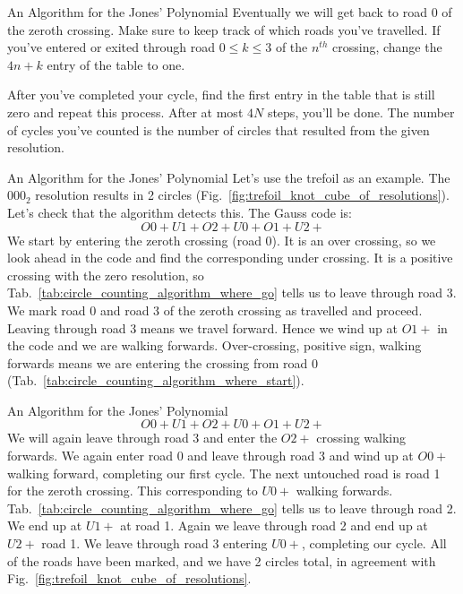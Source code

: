 \documentclass{beamer}
\begin{document}
    \begin{frame}{An Algorithm for the Jones' Polynomial}
        Eventually we will get back to road 0 of the zeroth crossing.
        Make sure to keep track of which roads you've travelled. If you've
        entered or exited through road $0\leq{k}\leq{3}$ of the $n^{th}$
        crossing, change the $4n+k$ entry of the table to one.
        \par\hfill\par
        After you've completed your cycle, find the first entry in the table
        that is still zero and repeat this process. After at most $4N$ steps,
        you'll be done. The number of cycles you've counted is the number of
        circles that resulted from the given resolution.
    \end{frame}
    \begin{frame}{An Algorithm for the Jones' Polynomial}
        Let's use the trefoil as an example. The $000_{2}$ resolution results
        in 2 circles (Fig.~\ref{fig:trefoil_knot_cube_of_resolutions}). Let's
        check that the algorithm detects this. The Gauss code is:
        \begin{equation}
            O0+U1+O2+U0+O1+U2+
        \end{equation}
        We start by entering the zeroth crossing
        (road 0). It is an over crossing, so we look ahead in the code and
        find the corresponding under crossing. It is a positive crossing with
        the zero resolution, so Tab.~\ref{tab:circle_counting_algorithm_where_go} tells
        us to leave through road 3. We mark road 0 and road 3 of the zeroth
        crossing as travelled and proceed. Leaving through road 3 means we
        travel forward. Hence we wind up at $O1+$ in the code and we are
        walking forwards. Over-crossing, positive sign, walking forwards means
        we are entering the crossing from road 0
        (Tab.~\ref{tab:circle_counting_algorithm_where_start}).
    \end{frame}
    \begin{frame}{An Algorithm for the Jones' Polynomial}
        \begin{equation}
            O0+U1+O2+U0+O1+U2+
        \end{equation}
        We will again leave through road 3 and enter the $O2+$ crossing walking
        forwards. We again enter road 0 and leave through road 3 and wind up at
        $O0+$ walking forward, completing our first cycle. The next untouched
        road is road 1 for the zeroth crossing. This corresponding to $U0+$
        walking forwards. Tab.~\ref{tab:circle_counting_algorithm_where_go}
        tells us to leave through road 2. We end up at $U1+$ at road 1. Again
        we leave through road 2 and end up at $U2+$ road 1. We leave through
        road 3 entering $U0+$, completing our cycle. All of the roads have been
        marked, and we have 2 circles total, in agreement with
        Fig.~\ref{fig:trefoil_knot_cube_of_resolutions}.
    \end{frame}
\end{document}
